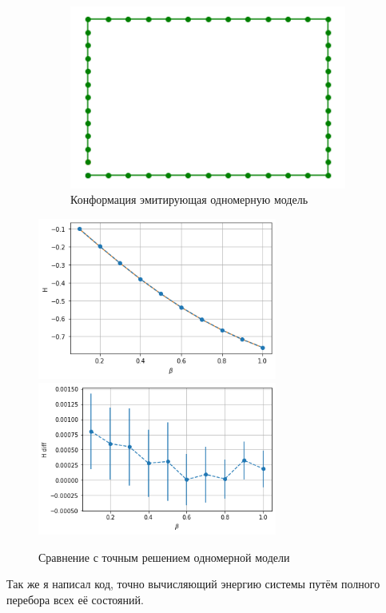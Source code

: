 \begin{figure}[H]
	\centering
	\begin{subfigure}[t]{0.7\textwidth}
		\includegraphics[width = \textwidth]{../images/1D_conf.png} 
		\caption{Конформация эмитирующая одномерную модель}
	\end{subfigure}
	\includegraphics[width = 0.7\textwidth]{../images/1D_ene.png}
	\includegraphics[width = 0.7\textwidth]{../images/1D_ene_diff.png} 
	\caption{Сравнение с точным решением одномерной модели}
\end{figure}

Так же я написал код, точно вычисляющий энергию системы путём полного перебора всех её состояний.


